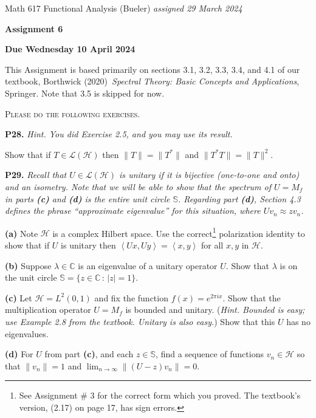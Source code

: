 \documentclass[12pt]{amsart}
\newcommand{\cH}{\mathcal{H}}
\newcommand{\cL}{\mathcal{L}}
\newcommand{\CC}{\mathbb{C}}
\newcommand{\ip}[2]{\ensuremath{\left<#1,#2\right>}}
\newcommand{\prob}[1]{\bigskip\noindent\textbf{#1.}\quad }
\newcommand{\epart}[1]{\medskip\noindent\textbf{(#1)}\quad }
\newcommand{\ds}{\displaystyle}
\begin{document}
\scriptsize \noindent Math 617 Functional Analysis (Bueler) \hfill \emph{assigned 29 March 2024}
\normalsize\medskip

\Large\centerline{\textbf{Assignment 6}}
\large
\medskip

\centerline{\textbf{Due Wednesday 10 April 2024}}
\medskip
\normalsize

\thispagestyle{empty}

\bigskip
\noindent This Assignment is based primarily on sections 3.1, 3.2, 3.3, 3.4, and 4.1 of our textbook, Borthwick (2020)~\emph{Spectral Theory: Basic Concepts and Applications}, Springer.  Note that 3.5 is skipped for now.

\medskip
\noindent \textsc{Please do the following exercises.}
\smallskip

\renewcommand{\SS}{\mathbb{S}}

\prob{P28}  \emph{Hint.  You did Exercise 2.5, and you may use its result.}

\medskip\noindent Show that if $T\in\cL(\cH)$ then $\|T\|=\|T^*\|$ and $\|T^*T\|=\|T\|^2$.


\prob{P29}  \emph{Recall that $U\in\cL(\cH)$ is \emph{unitary} if it is bijective (one-to-one and onto) and an isometry.  Note that we will be able to show that the spectrum of $U=M_f$ in parts \emph{\textbf{(c)}} and \emph{\textbf{(d)}} is the entire unit circle $\SS$.  Regarding part \emph{\textbf{(d)}}, Section 4.3 defines the phrase ``approximate eigenvalue'' for this situation, where $Uv_n \approx zv_n$.}

\epart{a}  Note $\cH$ is a complex Hilbert space.  Use the correct\footnote{See Assignment \# 3 for the correct form which you proved.  The textbook's version, (2.17) on page 17, has sign errors.} polarization identity to show that if $U$ is unitary then $\ip{Ux}{Uy}=\ip{x}{y}$ for all $x,y$ in $\cH$.

\epart{b}  Suppose $\lambda \in\CC$ is an eigenvalue of a unitary operator $U$.  Show that $\lambda$ is on the unit circle $\SS = \{z\in\CC\,:\,|z|=1\}$.

\epart{c}  Let $\cH = L^2(0,1)$ and fix the function $f(x) = e^{2\pi i x}$.  Show that the multiplication operator $U=M_f$ is bounded and unitary.  (\emph{Hint. Bounded is easy; use Example 2.8 from the textbook. Unitary is also easy.})  Show that this $U$ has no eigenvalues.

\epart{d}  For $U$ from part \textbf{(c)}, and each $z\in\SS$, find a sequence of functions $v_n\in\cH$ so that $\|v_n\|=1$ and $\ds \lim_{n\to\infty} \|(U-z)v_n\|=0$.
\end{document}
